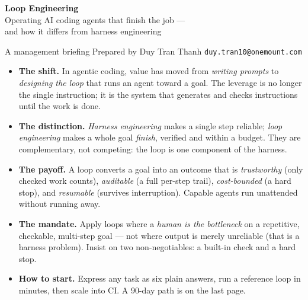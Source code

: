 \documentclass[11pt]{article}
\newcommand{\sotag}[1]{\textcolor{mckblue}{\textbf{#1}}}
\begin{document}
\thispagestyle{fancy}

\noindent{\color{mckblue}\rule{\textwidth}{2.5pt}}
\vspace{4pt}

{\fontsize{24}{27}\selectfont\bfseries\color{mckdeep} Loop Engineering}\\[3pt]
{\large\color{mcksteel} Operating AI coding agents that finish the job ---\\ and how it differs from harness engineering}

\vspace{6pt}
{\footnotesize\color{mckgray} A management briefing \quad\textbar\quad Prepared by Duy Tran Thanh \quad\textbar\quad \texttt{duy.tran10@onemount.com}}
\vspace{2pt}

\noindent{\color{mcklight}\rule{\textwidth}{1.2pt}}

\begin{tcolorbox}[colback=mckdeep!4,colframe=mckdeep,coltitle=white,
  fonttitle=\bfseries\large,title=Executive summary,sharp corners,boxrule=1pt,
  top=6pt,bottom=6pt,left=8pt,right=8pt]
\begin{itemize}[leftmargin=1.2em,itemsep=4pt,topsep=2pt]
\item \sotag{The shift.} In agentic coding, value has moved from \emph{writing
prompts} to \emph{designing the loop} that runs an agent toward a goal. The
leverage is no longer the single instruction; it is the system that generates
and checks instructions until the work is done.
\item \sotag{The distinction.} \emph{Harness engineering} makes a single step
reliable; \emph{loop engineering} makes a whole goal \emph{finish}, verified and
within a budget. They are complementary, not competing: the loop is one
component of the harness.
\item \sotag{The payoff.} A loop converts a goal into an outcome that is
\emph{trustworthy} (only checked work counts), \emph{auditable} (a full
per-step trail), \emph{cost-bounded} (a hard stop), and \emph{resumable}
(survives interruption). Capable agents run unattended without running away.
\item \sotag{The mandate.} Apply loops where a \emph{human is the bottleneck} on
a repetitive, checkable, multi-step goal --- not where output is merely
unreliable (that is a harness problem). Insist on two non-negotiables: a
built-in check and a hard stop.
\item \sotag{How to start.} Express any task as six plain answers, run a
reference loop in minutes, then scale into CI. A 90-day path is on the last
page.
\end{itemize}
\end{tcolorbox}
\end{document}
